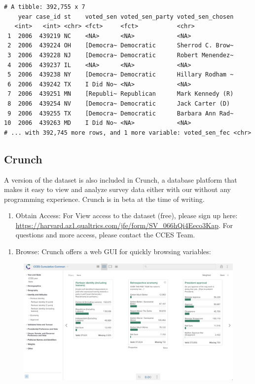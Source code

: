 \documentclass[10pt,article,oneside]{memoir}
\theoremstyle{definition}
\begin{document}
\begin{verbatim}
# A tibble: 392,755 x 7
    year case_id st    voted_sen voted_sen_party voted_sen_chosen
   <int>   <int> <chr> <fct>     <fct>           <chr>           
 1  2006  439219 NC    <NA>      <NA>            <NA>            
 2  2006  439224 OH    [Democra~ Democratic      Sherrod C. Brow~
 3  2006  439228 NJ    [Democra~ Democratic      Robert Menendez~
 4  2006  439237 IL    <NA>      <NA>            <NA>            
 5  2006  439238 NY    [Democra~ Democratic      Hillary Rodham ~
 6  2006  439242 TX    I Did No~ <NA>            <NA>            
 7  2006  439251 MN    [Republi~ Republican      Mark Kennedy (R)
 8  2006  439254 NV    [Democra~ Democratic      Jack Carter (D) 
 9  2006  439255 TX    [Democra~ Democratic      Barbara Ann Rad~
10  2006  439263 MD    I Did No~ <NA>            <NA>            
# ... with 392,745 more rows, and 1 more variable: voted_sen_fec <chr>
\end{verbatim}

\hypertarget{crunch}{%
\subsection{Crunch}\label{crunch}}

A version of the dataset is also included in Crunch, a database platform
that makes it easy to view and analyze survey data either with our
without any programming experience. Crunch is in beta at the time of
writing.

\begin{enumerate}
\def\labelenumi{\arabic{enumi}.}
\tightlist
\item
  Obtain Access: For View access to the dataset (free), please sign up
  here:
  \url{https://harvard.az1.qualtrics.com/jfe/form/SV_066hQi4Eeco3Kap}.
  For questions and more access, please contact the CCES Team.
\end{enumerate}

\newpage

\begin{enumerate}
\def\labelenumi{\arabic{enumi}.}
\setcounter{enumi}{1}
\tightlist
\item
  Browse: Crunch offers a web GUI for quickly browsing variables:
\end{enumerate}

\begin{figure}[H]
\centering
\centerline{\includegraphics[width=1.05\linewidth]{01_crunch_browse.png}}
\end{figure}
\end{document}
